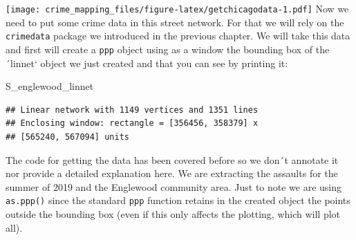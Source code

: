 \documentclass[
  krantz2]{krantz}
\makeatletter
\newenvironment{Shaded}{\begin{snugshade}}{\end{snugshade}}
\newcommand{\NormalTok}[1]{#1}
\newenvironment{kframe}{%
\medskip{}
\setlength{\fboxsep}{.8em}
 \def\at@end@of@kframe{}%
 \ifinner\ifhmode%
  \def\at@end@of@kframe{\end{minipage}}%
  \begin{minipage}{\columnwidth}%
 \fi\fi%
 \def\FrameCommand##1{\hskip\@totalleftmargin \hskip-\fboxsep
 \colorbox{shadecolor}{##1}\hskip-\fboxsep
     \hskip-\linewidth \hskip-\@totalleftmargin \hskip\columnwidth}%
 \MakeFramed {\advance\hsize-\width
   \@totalleftmargin\z@ \linewidth\hsize
   \@setminipage}}%
 {\par\unskip\endMakeFramed%
 \at@end@of@kframe}
\renewenvironment{Shaded}{\begin{kframe}}{\end{kframe}}
\makeatother
\begin{document}
\texttt{[image: crime\_mapping\_files/figure-latex/getchicagodata-1.pdf]}
Now we need to put some crime data in this street network. For that we will rely on the \texttt{crimedata} package we introduced in the previous chapter. We will take this data and first will create a \texttt{ppp} object using as a window the bounding box of the ´linnet` object we just created and that you can see by printing it:

\begin{Shaded}
\begin{Highlighting}[]
\NormalTok{S\_englewood\_linnet}
\end{Highlighting}
\end{Shaded}

\begin{verbatim}
## Linear network with 1149 vertices and 1351 lines
## Enclosing window: rectangle = [356456, 358379] x 
## [565240, 567094] units
\end{verbatim}

The code for getting the data has been covered before so we don´t annotate it nor provide a detailed explanation here. We are extracting the assaults for the summer of 2019 and the Englewood community area. Just to note we are using \texttt{as.ppp()} since the standard \texttt{ppp} function retains in the created object the points outside the bounding box (even if this only affects the plotting, which will plot all).
\end{document}
